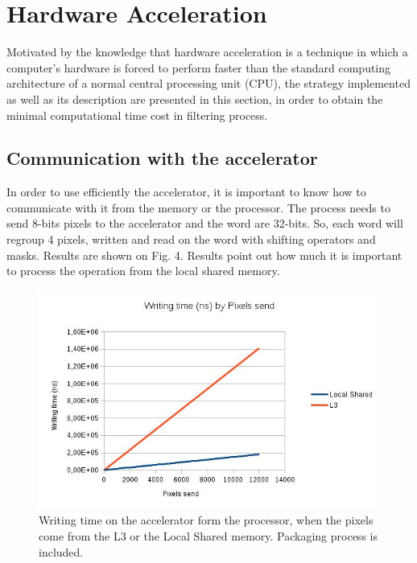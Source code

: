\documentclass[journal]{IEEEtran}
\begin{document}
\section{Hardware Acceleration}

Motivated by the knowledge that hardware acceleration is a technique in which a computer’s hardware is forced to perform faster than the standard computing architecture of a normal central processing unit (CPU), the strategy implemented as well as its description are presented in this section, in order to obtain the minimal computational time cost in filtering process.

\subsection{Communication with the accelerator}

In order to use efficiently the accelerator, it is important to know how to communicate with it from the memory or the processor. The process needs to send 8-bits pixels to the accelerator and the word are 32-bits. So, each word will regroup 4 pixels, written and read on the word with shifting operators and masks. Results are shown on Fig. 4. Results point out how much it is important to process the operation from the local shared memory.

\begin{figure}[!ht]
  \centering

  \includegraphics[scale=0.45]{graph.jpg}
  
  \protect\caption{Writing time on the accelerator form the processor, when the pixels come from the L3 or the Local Shared memory. Packaging process is included.}
\end{figure}
\end{document}
